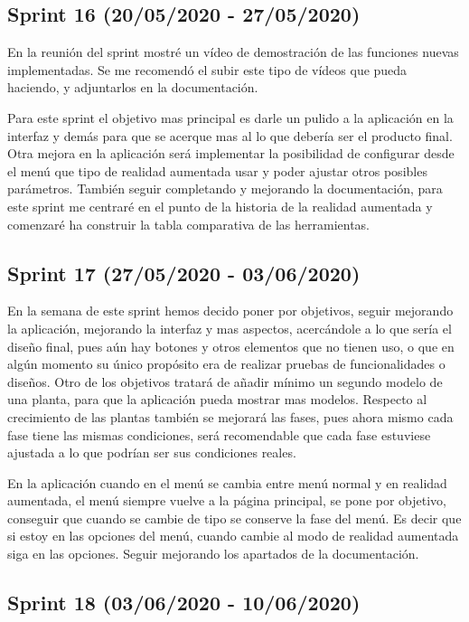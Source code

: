  \subsection{Sprint 16 (20/05/2020 - 27/05/2020)}
 
 En la reunión del sprint mostré un vídeo de demostración de las funciones nuevas implementadas. Se me recomendó el subir este tipo de vídeos que pueda haciendo, y adjuntarlos en la documentación.
 
 Para este sprint el objetivo mas principal es darle un pulido a la aplicación en la interfaz y demás para que se acerque mas al lo que debería ser el producto final. Otra mejora en la aplicación será implementar  la posibilidad de configurar desde el menú que tipo de realidad aumentada usar y poder ajustar otros posibles parámetros.  También seguir completando y mejorando la documentación, para este sprint me centraré en el punto de la historia de la realidad aumentada y comenzaré ha construir la tabla comparativa de las herramientas.
 
 \subsection{Sprint 17 (27/05/2020 - 03/06/2020)}
 
 En la semana de este sprint hemos decido poner por objetivos, seguir mejorando la aplicación, mejorando la interfaz y mas aspectos, acercándole a lo que sería el diseño final, pues aún hay botones y otros elementos que no tienen uso, o que en algún momento su único propósito era de realizar pruebas de funcionalidades o diseños. Otro de los objetivos tratará de añadir mínimo un segundo modelo de una planta, para que la aplicación pueda mostrar mas modelos. Respecto al crecimiento de las plantas también se mejorará las fases, pues ahora mismo cada fase tiene las mismas condiciones, será recomendable que cada fase estuviese ajustada a lo que podrían ser sus condiciones reales.
 
 En la aplicación cuando en el menú se cambia entre menú normal y en realidad aumentada, el menú siempre vuelve a la página principal, se pone por objetivo, conseguir que cuando se cambie de tipo se conserve  la fase del menú. Es decir que si estoy en las opciones del menú, cuando cambie al modo de realidad aumentada siga en las opciones.
 Seguir mejorando los apartados de la documentación.
 
 \subsection{Sprint 18 (03/06/2020 - 10/06/2020)}
  
